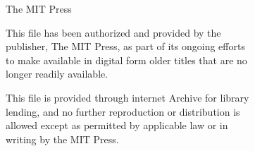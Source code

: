 \clearpage
\thispagestyle{empty}
\begin{center}
  \vspace*{2.2cm}
  {\Large The MIT Press\par}
  \vspace{1.6cm}
  This file has been authorized and provided by the\\
  publisher, The MIT Press, as part of its ongoing efforts\\
  to make available in digital form older titles that are no\\
  longer readily available.

  \vspace{\baselineskip}
  This file is provided through internet Archive for library\\
  lending, and no further reproduction or distribution is\\
  allowed except as permitted by applicable law or in\\
  writing by the MIT Press.
\end{center}
